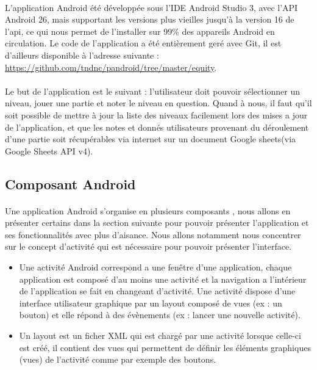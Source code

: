 \documentclass[a4paper, 10pt]{article}
\begin{document}
	\paragraph{}L'application Android  été développée sous l'IDE Android Studio 3, avec l'API Android 26, mais supportant les versions plus vieilles jusqu'à la version 16 de l'api, ce qui nous permet de l'installer sur 99\% des appareils Android en circulation. Le code de l'application a été entièrement geré avec Git, il est d'ailleurs  disponible à l'adresse suivante :  \url{https://github.com/tndnc/pandroid/tree/master/equity}. 
	\paragraph{}Le but de l'application est le suivant : l'utilisateur doit pouvoir sélectionner un niveau, jouer une partie et noter le niveau en question. Quand à nous, il faut qu'il soit possible de mettre à jour la liste des niveaux facilement lors des mises a jour de l'application, et que les notes et donnés utilisateurs provenant du déroulement d'une partie soit récupérables via internet sur un document Google sheets(via Google Sheets API v4).  
	
	\subsection{Composant Android}
	\paragraph{} Une application Android s'organise en plusieurs composants , nous allons en présenter certains dans la section suivante pour pouvoir présenter l'application et ses fonctionnalités avec plus d'aisance. Nous allons notamment nous concentrer sur le concept d'activité qui est nécessaire pour pouvoir présenter l'interface.
\hfill \break
\begin{itemize}
	\item Une activité Android correspond a une fenêtre d'une application, chaque application est composé d'au moins une activité et la navigation a l'intérieur de l'application se fait en changeant d'activité. Une activité dispose d'une interface utilisateur graphique  par un layout composé de vues (ex : un bouton) et elle répond à des évènements (ex : lancer une nouvelle activité).
	\item Un layout est un ficher XML qui est chargé par une activité lorsque celle-ci est créé, il contient des vues qui permettent de définir les éléments graphiques (vues) de l'activité comme par exemple des boutons.
\end{itemize}
\end{document}
